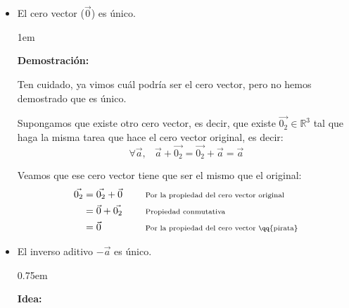 \documentclass[12pt, fleqn]{report}                             %
\newenvironment{SmallIndentation}[1][0.75em]                    %
        {\begin{adjustwidth}{#1}{}\begin{footnotesize}}             %
        {\end{footnotesize}\end{adjustwidth}}                       %
\newcommand \Quote {\qq}                                        %
\DeclareMathOperator \Space {\quad}                             %
\DeclareMathOperator \MiniSpace {\;}                            %
\newcommand \Remember[1]{\Space\text{\scriptsize{#1}}}          %
\theoremstyle{break}                                            %
\begin{document}
                \begin{itemize}

                    \item El cero vector ($\vec{0}$) es único.
                    
                        \begin{SmallIndentation}[1em]
                            \textbf{Demostración:} 

                            Ten cuidado, ya vimos cuál podría ser el cero vector, pero no hemos demostrado
                            que es único.

                            Supongamos que existe otro cero vector, es decir, que existe $\vec{0_2} \in \mathbb{R}^3$
                            tal que haga la misma tarea que hace el cero vector original, es decir:
                            \begin{equation*}
                                \forall \vec{a}, \MiniSpace 
                                    \vec{a} + \vec{0_2} = \vec{0_2} + \vec{a} = \vec{a} 
                            \end{equation*}

                            Veamos que ese cero vector \Quote{pirata} tiene que ser el mismo que el original:
                            \begin{align*}
                                \vec{0_2} 
                                    &= \vec{0_2} + \vec{0}      &&\Remember{Por la propiedad del cero vector original}          \\
                                    &= \vec{0}   + \vec{0_2}    &&\Remember{Propiedad conmutativa}                              \\
                                    &= \vec{0}                  &&\Remember{Por la propiedad del cero vector \Quote{pirata}}
                            \end{align*}

                        \end{SmallIndentation}
                    
                    \item El inverso aditivo $-\vec{a}$ es único.
                
                        \begin{SmallIndentation}
                            \textbf{Idea:}


\end{SmallIndentation}
\end{itemize}
\end{document}
